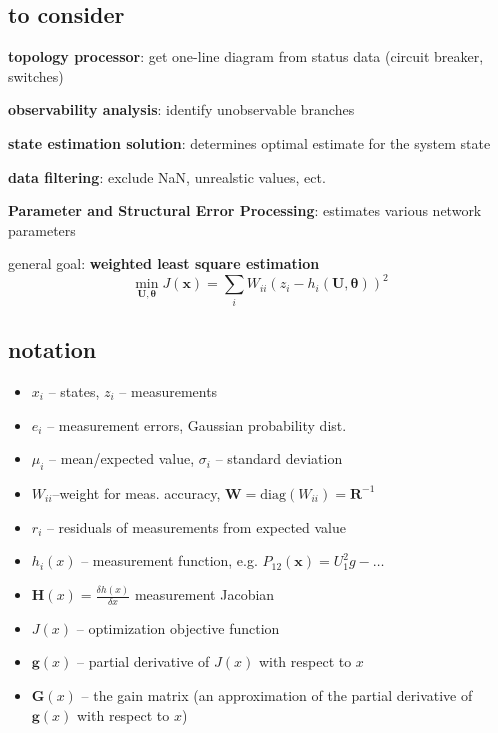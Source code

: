 \documentclass[a4paper,10pt,landscape]{scrartcl}
\begin{document}
\begin{multicols*}{3}
\subsection{to consider}
\textbf{topology processor}: get one-line diagram from status data (circuit breaker, switches)

\textbf{observability analysis}: identify unobservable branches

\textbf{state estimation solution}: determines optimal estimate for the system state

\textbf{data filtering}: exclude NaN, unrealstic values, ect.

\textbf{Parameter and Structural Error Processing}: estimates various network parameters

general goal: \textbf{weighted least square estimation}
$$\min _{\mathbf{U}, \boldsymbol{\theta}} J(\mathbf{x})=\sum_i W_{i i}\left(z_i-h_i(\mathbf{U}, \boldsymbol{\theta})\right)^2$$

\subsection{notation}
\begin{itemize}
    \item $x_i$ – states, $z_i$ – measurements
    \item $e_i$ – measurement errors, Gaussian probability dist.
    \item $\mu_i$ – mean/expected value, $\sigma_i$ – standard deviation
    \item $W_{ii}$–weight for meas. accuracy, $\mathbf{W} = \text{diag}(W_{ii}) = \mathbf{R}^{-1}$
    \item $r_i$ – residuals of measurements from expected value
    \item $h_i(x)$ – measurement function, e.g. $P_{12}(\mathbf{x})=U_1^2g-\dots$
    \item $\mathbf{H}(x)=\frac{\delta h(x)}{\delta x}$ measurement Jacobian 
    \item $J(x)$ – optimization objective function
    \item $\mathbf{g}(x)$ – partial derivative of $J(x)$ with respect to $x$
    \item $\mathbf{G}(x)$ – the gain matrix (an approximation of the partial derivative of $\mathbf{g}(x)$ with respect to $x$)
\end{itemize}


\end{multicols*}
\end{document}
